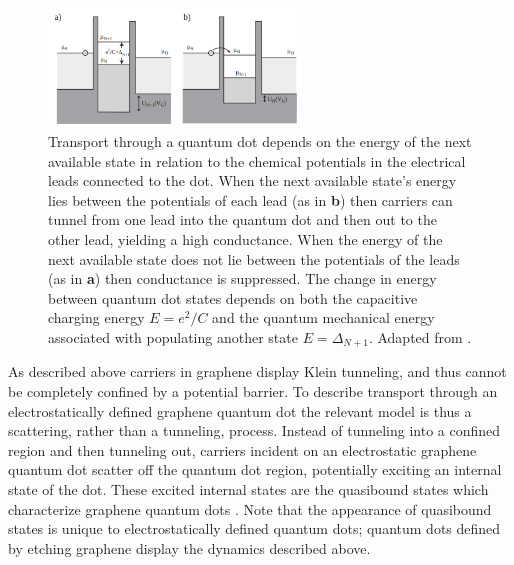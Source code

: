 \documentclass[edeposit,fullpage,draftthesis]{uiucthesis2009}
\begin{document}
            \begin{figure}
            \centering
            \includegraphics[width=0.6\textwidth]{images/background/cb_energies.png}
            \caption[Coulomb blockade energy levels]{
            Transport through a quantum dot depends on the energy of the next available state in
            relation to the chemical potentials in the electrical leads connected to the dot.
            When the next available state's energy lies between the potentials of each lead (as in \textbf{b})
            then carriers can tunnel from one lead into the quantum dot and then out to the other lead,
            yielding a high conductance. When the energy of the next available state does not lie between
            the potentials of the leads (as in \textbf{a}) then conductance is suppressed. The change
            in energy between quantum dot states depends on both the capacitive charging energy $E = e^2 / C$
            and the quantum mechanical energy associated with populating another state $E = \Delta_{N+1}$.
            Adapted from \cite{cb_lecture07}.
            }
            \label{fig:cb_energies}
            \end{figure}
 
        
        As described above carriers in graphene display Klein tunneling, and thus cannot be completely confined
        by a potential barrier. To describe transport through an electrostatically defined graphene quantum dot
        the relevant model is thus a scattering, rather than a tunneling, process.
        Instead of tunneling into a confined region and then tunneling out, carriers incident on an electrostatic
        graphene quantum dot scatter off the quantum dot region, potentially exciting an internal state of the dot.
        These excited internal states are the quasibound states which characterize graphene quantum dots
        \cite{pereira2006confined, silvestrov2007quantum, matulis2008quasibound, nguyen2009quasi}.
        Note that the appearance of quasibound states is unique to electrostatically defined quantum dots; 
        quantum dots defined by etching graphene display the dynamics described above.
        
\end{document}
